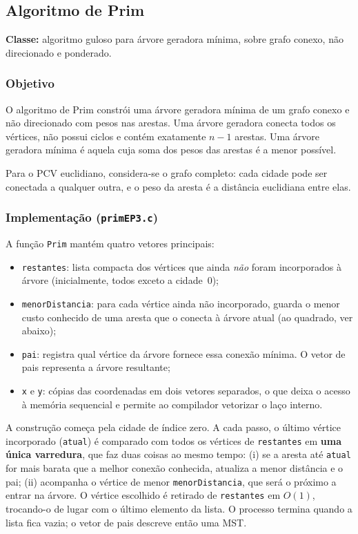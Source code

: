 \documentclass[11pt,a4paper]{article}
\renewcommand{\_}{\underscoreoriginal\allowbreak}
\begin{document}
\subsection{Algoritmo de Prim}
\label{sec:prim}

\textbf{Classe:} algoritmo guloso para árvore geradora mínima, sobre
grafo conexo, não direcionado e ponderado.

\subsubsection*{Objetivo}

O algoritmo de Prim constrói uma árvore geradora mínima de um grafo
conexo e não direcionado com pesos nas arestas. Uma árvore geradora
conecta todos os vértices, não possui ciclos e contém exatamente $n-1$
arestas. Uma árvore geradora mínima é aquela cuja soma dos pesos das
arestas é a menor possível.

Para o PCV euclidiano, considera-se o grafo completo: cada cidade pode
ser conectada a qualquer outra, e o peso da aresta é a distância
euclidiana entre elas.

\subsubsection*{Implementação (\texttt{primEP3.c})}

A função \texttt{Prim} mantém quatro vetores principais:

\begin{itemize}
  \item \texttt{restantes}: lista compacta dos vértices que ainda
    \emph{não} foram incorporados à árvore (inicialmente, todos exceto
    a cidade~0);
  \item \texttt{menorDistancia}: para cada vértice ainda não
    incorporado, guarda o menor custo conhecido de uma aresta que o
    conecta à árvore atual (ao quadrado, ver abaixo);
  \item \texttt{pai}: registra qual vértice da árvore fornece essa
    conexão mínima. O vetor de pais representa a árvore resultante;
  \item \texttt{x} e \texttt{y}: cópias das coordenadas em dois vetores
    separados, o que deixa o acesso à memória sequencial e permite ao
    compilador vetorizar o laço interno.
\end{itemize}

A construção começa pela cidade de índice zero. A cada passo, o último
vértice incorporado (\texttt{atual}) é comparado com todos os vértices
de \texttt{restantes} em \textbf{uma única varredura}, que faz duas
coisas ao mesmo tempo: (i) se a aresta até \texttt{atual} for mais
barata que a melhor conexão conhecida, atualiza a menor distância e o
pai; (ii) acompanha o vértice de menor \texttt{menorDistancia}, que será
o próximo a entrar na árvore. O vértice escolhido é retirado de
\texttt{restantes} em $O(1)$, trocando-o de lugar com o último elemento
da lista. O processo termina quando a lista fica vazia; o vetor de pais
descreve então uma MST.
\end{document}
